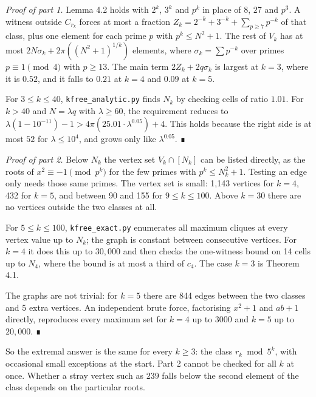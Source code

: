\documentclass[
  11pt,
]{article}
\begin{document}
\emph{Proof of part 1.} Lemma 4.2 holds with \(2^k\), \(3^k\) and
\(p^k\) in place of \(8\), \(27\) and \(p^3\). A witness outside
\(C_{r_k}\) forces at most a fraction
\(Z_k = 2^{-k} + 3^{-k} + \sum_{p\ge 7} p^{-k}\) of that class, plus one
element for each prime \(p\) with \(p^k \le N^2 + 1\). The rest of
\(V_k\) has at most \(2N\sigma_k + 2\pi((N^2 + 1)^{1/k})\) elements,
where \(\sigma_k = \sum p^{-k}\) over primes \(p \equiv 1 \pmod{4}\)
with \(p \ge 13\). The main term \(2Z_k + 2q\sigma_k\) is largest at
\(k = 3\), where it is \(0.52\), and it falls to \(0.21\) at \(k = 4\)
and \(0.09\) at \(k = 5\).

For \(3 \le k \le 40\), \texttt{kfree\_analytic.py} finds \(N_k\) by
checking cells of ratio \(1.01\). For \(k > 40\) and \(N = \lambda q\)
with \(\lambda \ge 60\), the requirement reduces to
\(\lambda(1 - 10^{-11}) - 1 > 4\pi(25.01\cdot\lambda^{0.05}) + 4\). This
holds because the right side is at most \(52\) for
\(\lambda \le 10^{4}\), and grows only like \(\lambda^{0.05}\). ∎

\emph{Proof of part 2.} Below \(N_k\) the vertex set \(V_k \cap [N_k]\)
can be listed directly, as the roots of \(x^2 \equiv -1 \pmod{p^k}\) for
the few primes with \(p^k \le N_k^2 + 1\). Testing an edge only needs
those same primes. The vertex set is small: 1,143 vertices for
\(k = 4\), 432 for \(k = 5\), and between 90 and 155 for
\(9 \le k \le 100\). Above \(k = 30\) there are no vertices outside the
two classes at all.

For \(5 \le k \le 100\), \texttt{kfree\_exact.py} enumerates all maximum
cliques at every vertex value up to \(N_k\); the graph is constant
between consecutive vertices. For \(k = 4\) it does this up to
\(30{,}000\) and then checks the one-witness bound on 14 cells up to
\(N_4\), where the bound is at most a third of \(c_4\). The case
\(k = 3\) is Theorem 4.1.

The graphs are not trivial: for \(k = 5\) there are 844 edges between
the two classes and 5 extra vertices. An independent brute force,
factorising \(x^2 + 1\) and \(ab + 1\) directly, reproduces every
maximum set for \(k = 4\) up to \(3000\) and \(k = 5\) up to
\(20{,}000\). ∎

So the extremal answer is the same for every \(k \ge 3\): the class
\(r_k \bmod 5^k\), with occasional small exceptions at the start. Part 2
cannot be checked for all \(k\) at once. Whether a stray vertex such as
\(239\) falls below the second element of the class depends on the
particular roots.
\end{document}
